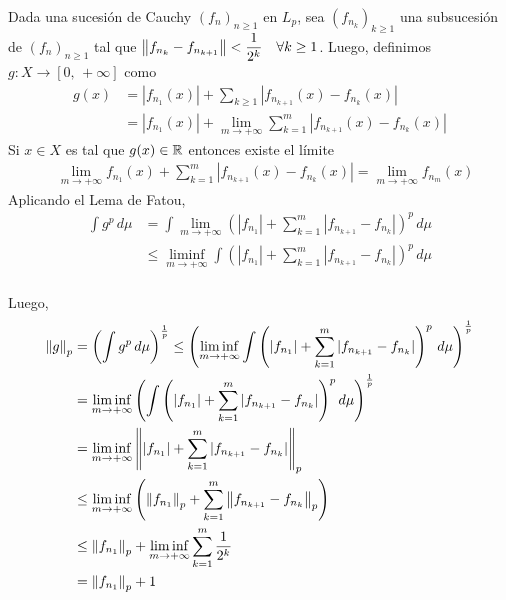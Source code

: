 Dada una sucesión de Cauchy \((f_n)_{n \geq 1}\) en \(L_p\), sea \((f_{n_k})_{k \geq 1}\) una subsucesión de \((f_n)_{n \geq 1}\) tal que \(\left\lVert f_{n_k} - f_{n_{k+1}}\right\rVert < \dfrac{1}{2^k} \quad \forall k \geq 1\). Luego, definimos
\(g : X \to [0 \text{, } +\infty]\) como \begin{align*}
    g(x) & = |f_{n_1}(x)| + \sum_{k \geq 1} |f_{n_{k+1}}(x)-f_{n_k}(x)|                       \\
         & = |f_{n_1}(x)| + \lim_{m \to +\infty} \sum_{k = 1}^m |f_{n_{k+1}}(x) - f_{n_k}(x)|
\end{align*}
Si \(x \in X\) es tal que \(g(x) \in \mathbb{R}\) entonces existe el límite \begin{align*}
     & \lim_{m \to +\infty} f_{n_1}(x) + \sum_{k = 1}^m |f_{n_{k+1}}(x) - f_{n_k}(x)| = \lim_{m \to +\infty} f_{n_m}(x)
\end{align*}
Aplicando el Lema de Fatou, \begin{align*}
    \int g^p \, d\mu & = \int \lim_{m \to +\infty} \left(|f_{n_1}| + \sum_{k = 1}^m |f_{n_{k+1}} - f_{n_k}| \right)^p \, d\mu      \\
                     & \leq \liminf_{m \to +\infty} \int \left(|f_{n_1}| + \sum_{k = 1}^m |f_{n_{k+1}} - f_{n_k}|\right)^p \, d\mu \\
\end{align*}

Luego, \begin{align*}
    \left\lVert g\right\rVert_p & = \left(\int g^p \, d\mu \right)^{\frac{1}{p}} \leq \left( \liminf_{m \to +\infty} \int \left( |f_{n_1}| + \sum_{k = 1}^m |f_{n_{k+1}} - f_{n_k} | \right)^p \, d\mu \right)^{\frac{1}{p}} \\
               & = \liminf_{m \to +\infty} \left( \int \left( |f_{n_1}| + \sum_{k = 1}^m |f_{n_{k+1}} - f_{n_k}| \right)^p d\mu \right)^{\frac{1}{p}}                                                       \\
               & = \liminf_{m \to +\infty} \left\lVert |f_{n_1}| + \sum_{k = 1}^m | f_{n_{k+1}} - f_{n_k} |\right\rVert_p                                                                                                   \\
               & \leq \liminf_{m \to +\infty} \left( \left\lVert f_{n_1}\right\rVert_p + \sum_{k = 1}^m \left\lVert f_{n_{k+1}} - f_{n_k}\right\rVert_p \right)                                                                               \\
               & \leq \left\lVert f_{n_1}\right\rVert_p + \liminf_{m \to +\infty} \sum_{k = 1}^m \frac{1}{2^k}                                                                                                               \\
               & = \left\lVert f_{n_1}\right\rVert_p + 1
\end{align*}

